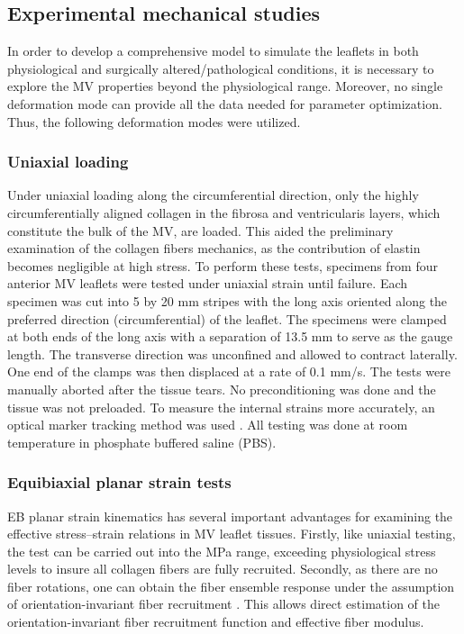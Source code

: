 \subsection{Experimental mechanical studies}

    In order to develop a comprehensive model to simulate the leaflets in both physiological and surgically altered/pathological conditions, it is necessary to explore the MV properties beyond the physiological range. Moreover, no single deformation mode can provide all the data needed for parameter optimization. Thus, the following deformation modes were utilized.


\subsubsection{Uniaxial loading}

    Under uniaxial loading along the circumferential direction, only the highly circumferentially aligned collagen in the fibrosa and ventricularis layers, which constitute the bulk of the MV, are loaded. This aided the preliminary examination of the collagen fibers mechanics, as the contribution of elastin becomes negligible at high stress. To perform these tests, specimens from four anterior MV leaflets were tested under uniaxial strain until failure. Each specimen was cut into 5 by 20 mm stripes with the long axis oriented along the preferred direction (circumferential) of the leaflet. The specimens were clamped at both ends of the long axis with a separation of 13.5 mm to serve as the gauge length. The transverse direction was unconfined and allowed to contract laterally. One end of the clamps was then displaced at a rate of 0.1 mm/s. The tests were manually aborted after the tissue tears. No preconditioning was done and the tissue was not preloaded. To measure the internal strains more accurately, an optical marker tracking method was used \cite{billiar_biaxial_2000}. All testing was done at room temperature in phosphate buffered saline (PBS).


\subsubsection{Equibiaxial planar strain tests}

    EB planar strain kinematics has several important advantages for examining the effective stress–strain relations in MV leaflet tissues. Firstly, like uniaxial testing, the test can be carried out into the MPa range, exceeding physiological stress levels to insure all collagen fibers are fully recruited. Secondly, as there are no fiber rotations, one can obtain the fiber ensemble response under the assumption of orientation-invariant fiber recruitment \cite{fata_insights_2014,sacks_incorporation_2003,fan_simulation_2014}. This allows direct estimation of the orientation-invariant fiber recruitment function and effective fiber modulus.
    
